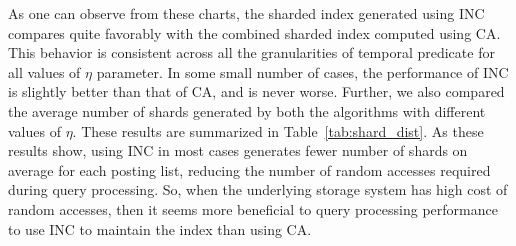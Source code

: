 As one can observe from these charts, the sharded index generated
using INC compares quite favorably with the combined sharded index
computed using CA. This behavior is consistent across all the
granularities of temporal predicate for all values of $\eta$
parameter. In some small number of cases, the performance of INC is
slightly better than that of CA, and is never worse. Further, we also
compared the average number of shards generated by both the algorithms
with different values of $\eta$. These results are summarized in
Table~\ref{tab:shard_dist}. As these results show, using INC in most
cases generates fewer number of shards on average for each posting
list, reducing the number of random accesses required during query
processing. So, when the underlying storage system has high cost of
random accesses, then it seems more beneficial to query processing
performance to use INC to maintain the index than using CA.






